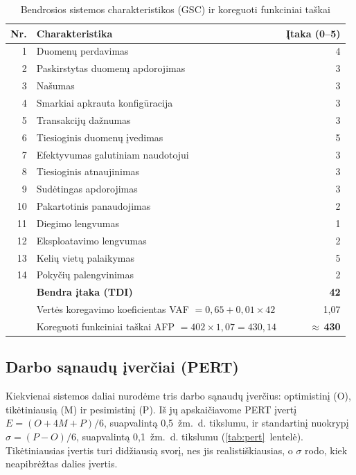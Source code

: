 \begin{table}[H]
  \centering
  \caption{Bendrosios sistemos charakteristikos (GSC) ir koreguoti funkciniai taškai}
  \label{tab:gsc}
  \small
  \begin{tabularx}{0.85\textwidth}{@{}rXr@{}}
    \toprule
    \textbf{Nr.} & \textbf{Charakteristika} & \textbf{Įtaka (0--5)} \\
    \midrule
    1 & Duomenų perdavimas & 4 \\
    2 & Paskirstytas duomenų apdorojimas & 3 \\
    3 & Našumas & 3 \\
    4 & Smarkiai apkrauta konfigūracija & 3 \\
    5 & Transakcijų dažnumas & 3 \\
    6 & Tiesioginis duomenų įvedimas & 5 \\
    7 & Efektyvumas galutiniam naudotojui & 3 \\
    8 & Tiesioginis atnaujinimas & 3 \\
    9 & Sudėtingas apdorojimas & 3 \\
    10 & Pakartotinis panaudojimas & 2 \\
    11 & Diegimo lengvumas & 1 \\
    12 & Eksploatavimo lengvumas & 2 \\
    13 & Kelių vietų palaikymas & 5 \\
    14 & Pokyčių palengvinimas & 2 \\
    \midrule
    & \textbf{Bendra įtaka (TDI)} & \textbf{42} \\
    & Vertės koregavimo koeficientas VAF $= 0{,}65 + 0{,}01 \times 42$ & 1,07 \\
    & Koreguoti funkciniai taškai AFP $= 402 \times 1{,}07 = 430{,}14$ & \textbf{$\approx$\,430} \\
    \bottomrule
  \end{tabularx}
\end{table}

\subsection{Darbo sąnaudų įverčiai (PERT)}

Kiekvienai sistemos daliai nurodėme tris darbo sąnaudų įverčius:
optimistinį (O), tikėtiniausią (M) ir pesimistinį (P). Iš jų apskaičiavome
PERT įvertį $E = (O + 4M + P)/6$, suapvalintą 0,5~žm.~d. tikslumu, ir
standartinį nuokrypį $\sigma = (P - O)/6$, suapvalintą 0,1~žm.~d. tikslumu
(\ref{tab:pert}~lentelė). Tikėtiniausias įvertis turi didžiausią svorį, nes
jis realistiškiausias, o $\sigma$ rodo, kiek neapibrėžtas dalies įvertis.

